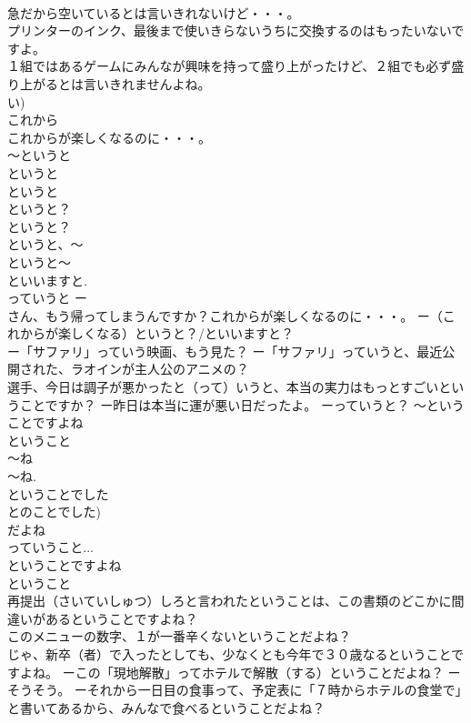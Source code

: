 \documentclass[8pt]{extreport}
\begin{document}
\begin{CJK}{UTF8}{min}
\\	急だから空いているとは言いきれないけど・・・。 
\\	プリンターのインク、最後まで使いきらないうちに交換するのはもったいないですよ。 
\\	１組ではあるゲームにみんなが興味を持って盛り上がったけど、２組でも必ず盛り上がるとは言いきれませんよね。　
\\	い)
\\	これから	
\\	これからが楽しくなるのに・・・。 
\\	～というと	
\\	というと
\\	というと 
\\	というと？ 
\\	というと？ 
\\	というと、～
\\	というと～ 
\\	といいますと. 
\\	っていうと ー
\\	さん、もう帰ってしまうんですか？これからが楽しくなるのに・・・。 ー（これからが楽しくなる）というと？/といいますと？ 
\\	ー「サファリ」っていう映画、もう見た？ ー「サファリ」っていうと、最近公開された、ラオインが主人公のアニメの？ 
\\	選手、今日は調子が悪かったと（って）いうと、本当の実力はもっとすごいということですか？ ー昨日は本当に運が悪い日だったよ。 ーっていうと？ ～ということですよね 
\\	ということ 
\\	～ね 
\\	～ね. 
\\	ということでした 
\\	とのことでした) 
\\	だよね 
\\	っていうこと... 
\\	ということですよね 
\\	ということ 
\\	再提出（さいていしゅつ）しろと言われたということは、この書類のどこかに間違いがあるということですよね？ 
\\	このメニューの数字、１が一番辛くないということだよね？ 
\\	じゃ、新卒（者）で入ったとしても、少なくとも今年で３０歳なるということですよね。 ーこの「現地解散」ってホテルで解散（する）ということだよね？ ーそうそう。 ーそれから一日目の食事って、予定表に「７時からホテルの食堂で」と書いてあるから、みんなで食べるということだよね？ 

\end{CJK}
\end{document}
